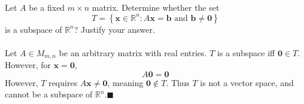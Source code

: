\documentclass{article}
\begin{document}
\newpage
{} Let $A$ be a fixed $m \times n$ matrix. Determine whether the set 
\[ T = \left\{ \mathbf{x}  \in \mathbb{R}^n  :  A \mathbf{x} = \mathbf{b}  \text{ and  }  \mathbf{b} \neq \mathbf{0}\right\} \] 
is a subspace of $\mathbb{R}^n$?  Justify your answer. \\
\noindent\makebox[\linewidth]{\rule{\linewidth}{0.4pt}}\\
Let \(A\in M_{m,n}\) be an arbitrary matrix with real entries. \(T\) is a subspace iff \(\mathbf{0} \in T\). However, for \(\mathbf{x} =\mathbf{0} \),
\[
  A \mathbf{0} =\mathbf{0}
\]
However, \(T\) requires \(A \mathbf{x} \neq \mathbf{0} \), meaning \(\mathbf{0}\notin T \). Thus \(T\) is not a vector space, and cannot be a subspace of \(\mathbb{R} ^n\).\hfill\(\blacksquare\)\\
\end{document}

